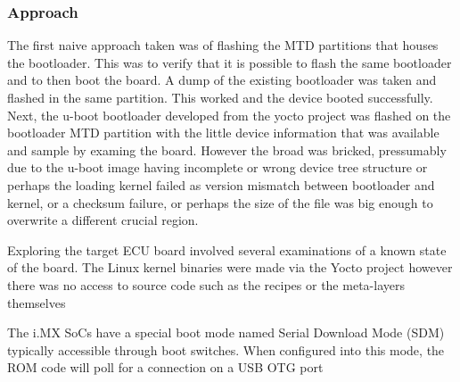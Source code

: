 
\subsubsection*{Approach}

The first naive approach taken was of flashing the MTD partitions that houses the bootloader. This was to verify that it is possible to flash the same bootloader and to then boot the board. A dump of the existing bootloader was taken and flashed in the same partition. This worked and the device booted successfully. Next, the u-boot bootloader developed from the yocto project was flashed on the bootloader MTD partition with the little device information that was available and sample by examing the board. However the broad was bricked, pressumably due to the u-boot image having incomplete or wrong device tree structure or perhaps the loading kernel failed as version mismatch between bootloader and kernel, or a checksum failure, or perhaps the size of the file was big enough to overwrite a different crucial region.



Exploring the target ECU board involved several examinations of a known state of the board. The Linux kernel binaries were made via the Yocto project however there was no access to source code such as the recipes or the meta-layers themselves

The i.MX SoCs have a special boot mode named Serial Download Mode (SDM) typically accessible through boot switches. When configured into this mode, the ROM code will poll for a connection on a USB OTG port
